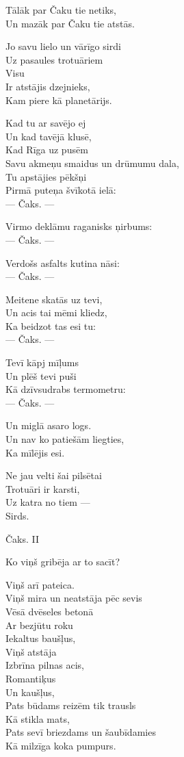 \documentclass[14pt]{extarticle}
\begin{document}
Tālāk par Čaku tie netiks,\\
Un mazāk par Čaku tie atstās.

Jo savu lielo un vārīgo sirdi\\
Uz pasaules trotuāriem\\
Visu\\
Ir atstājis dzejnieks,\\
Kam piere kā planetārijs.

Kad tu ar savējo ej\\
Un kad tavējā klusē,\\
Kad Rīga uz pusēm\\
Savu akmeņu smaidus un drūmumu dala,\\
Tu apstājies pēkšņi\\
Pirmā puteņa švīkotā ielā:\\
--- Čaks. ---

Virmo deklāmu raganisks ņirbums:\\
--- Čaks. ---

Verdošs asfalts kutina nāsi:\\
--- Čaks. ---

Meitene skatās uz tevi,\\
Un acis tai mēmi kliedz,\\
Ka beidzot tas esi tu:\\
--- Čaks. ---

Tevī kāpj mīļums\\
Un plēš tevi puši\\
Kā dzīvsudrabs termometru:\\
--- Čaks. ---

Un miglā asaro logs.\\
Un nav ko patiešām liegties,\\
Ka mīlējis esi.

Ne jau velti šai pilsētai\\
Trotuāri ir karsti,\\
Uz katra no tiem ---\\
Sirds.



\newpage

{\large \sc Čaks. II}

Ko viņš gribēja ar to sacīt?

Viņš arī pateica.\\
Viņš mira un neatstāja pēc sevis\\
Vēsā dvēseles betonā\\
Ar bezjūtu roku\\
Iekaltus baušļus,\\
Viņš atstāja\\
Izbrīna pilnas acis,\\
Romantiķus\\
Un kaušļus,\\
Pats būdams reizēm tik trausls\\
Kā stikla mats,\\
Pats sevī briezdams un šaubīdamies\\
Kā milzīga koka pumpurs.
\end{document}
